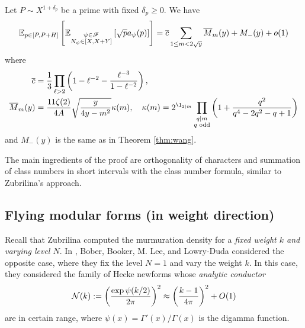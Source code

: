 \begin{theorem}
    \label{thm:wanglocal}
    Let $P \sim X^{1 + \delta_p}$ be a prime with fixed $\delta_p \ge 0$.
    We have
    \begin{equation}
        \mathbb{E}_{p \in [P, P + H]}\left[\mathbb{E}_{\substack{\psi \in \mathscr{F} \\ N_\psi \in [X, X + Y]}}\left[\sqrt{p} a_\psi(p)\right]\right] = \overline{c} \sum_{1 \le m < 2 \sqrt{y}} \overline{M}_m(y) + M_-(y) + o(1)
    \end{equation}
    where
    \begin{align*}
        \overline{c} &= \frac{1}{3} \prod_{\ell > 2} \left(1 - \ell^{-2} - \frac{\ell^{-3}}{1 - \ell^{-2}}\right),\\
        \overline{M}_m(y) &= \frac{11\zeta(2)}{4A} \sqrt{\frac{y}{4y - m^2}} \kappa(m), \quad \kappa(m) = 2^{\1_{2 \mid m}} \prod_{\substack{q \mid m \\ q \text{ odd}}} \left(1 + \frac{q^2}{q^4 - 2q^2 - q + 1}\right)
    \end{align*}
    and $M_-(y)$ is the same as in Theorem \ref{thm:wang}.
\end{theorem}


The main ingredients of the proof are orthogonality of characters and summation of class numbers in short intervals with the class number formula, similar to Zubrilina's approach.

\subsection{Flying modular forms (in weight direction)}


Recall that Zubrilina computed the murmuration density for a \emph{fixed weight $k$ and varying level $N$}.
In \cite{bober2023murmurations}, Bober, Booker, M. Lee, and Lowry-Duda considered the opposite case, where they fix the level $N = 1$ and vary the weight $k$.
In this case, they considered the family of Hecke newforms whose \emph{analytic conductor}
\[
\mathcal{N}(k) := \left(\frac{\exp \psi(k/2)}{2 \pi}\right)^2 \approx \left(\frac{k-1}{4 \pi}\right)^2 + O(1)
\]
are in certain range, where $\psi(x) = \Gamma'(x)/\Gamma(x)$ is the digamma function.

